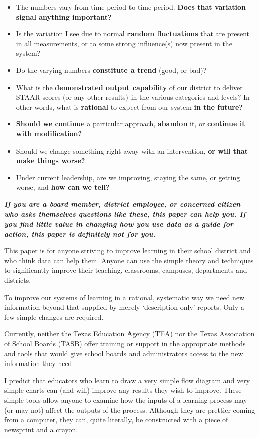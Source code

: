 \documentclass[
  letterpaper,
  DIV=11,
  numbers=noendperiod]{scrartcl}
\begin{document}
\begin{itemize}
\item
  The numbers vary from time period to time period. \textbf{Does that
  variation signal anything important?}
\item
  Is the variation I see due to normal \textbf{random fluctuations} that
  are present in all measurements, or to some strong influence(s) now
  present in the system?
\item
  Do the varying numbers \textbf{constitute a trend} (good, or bad)?
\item
  What is the \textbf{demonstrated output capability} of our district to
  deliver STAAR scores (or any other results) in the various categories
  and levels? In other words, what is \textbf{rational} to expect from
  our system \textbf{in the future?}
\item
  \textbf{Should we continue} a particular approach, \textbf{abandon}
  it, or \textbf{continue it with modification?}
\item
  Should we change something right away with an intervention, \textbf{or
  will that make things worse?}
\item
  Under current leadership, are we improving, staying the same, or
  getting worse, and \textbf{how can we tell?}
\end{itemize}

\textbf{\emph{If you are a board member, district employee, or concerned
citizen who asks themselves questions like these, this paper can help
you. If you find little value in changing how you use data as a guide
for action, this paper is definitely not for you.}}

This paper is for anyone striving to improve learning in their school
district and who think data can help them. Anyone can use the simple
theory and techniques to significantly improve their teaching,
classrooms, campuses, departments and districts.

To improve our systems of learning in a rational, systematic way we need
new information beyond that supplied by merely `description-only'
reports. Only a few simple changes are required.

Currently, neither the Texas Education Agency (TEA) nor the Texas
Association of School Boards (TASB) offer training or support in the
appropriate methods and tools that would give school boards and
administrators access to the new information they need.

I predict that educators who learn to draw a very simple flow diagram
and very simple charts can (and will) improve any results they wish to
improve. These simple tools allow anyone to examine how the inputs of a
learning process may (or may not) affect the outputs of the process.
Although they are prettier coming from a computer, they can, quite
literally, be constructed with a piece of newsprint and a crayon.
\end{document}
